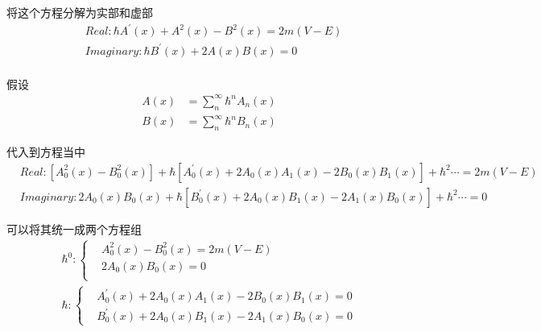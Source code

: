 \documentclass{article}
\begin{document}
将这个方程分解为实部和虚部
\begin{align*}
    &Real:\hbar A^\prime(x)+A^2(x)-B^2(x)=2m(V-E)\\
    &Imaginary:\hbar B^\prime(x)+2A(x)B(x)=0\\
\end{align*}

假设
\begin{align*}
    A(x)&=\sum_n^\infty \hbar^n A_n(x)\\
    B(x)&=\sum_n^\infty \hbar^n B_n(x)
\end{align*}

代入到方程当中
\begin{align*}
    &Real:\left[A^2_0(x)-B^2_0(x)\right]+\hbar\left[A^\prime_0(x)+2A_0(x)A_1(x)-2B_0(x)B_1(x)\right]+\hbar^2\cdots=2m(V-E)\\
    &Imaginary:2A_0(x)B_0(x)+\hbar\left[B^\prime_0(x)+2A_0(x)B_1(x)-2A_1(x)B_0(x)\right]+\hbar^2\cdots=0
\end{align*}

可以将其统一成两个方程组
\begin{align*}
    \hbar^0:
    \begin{cases}
        &A^2_0(x)-B^2_0(x)=2m(V-E)\\
        &2A_0(x)B_0(x)=0\\
    \end{cases}\\
    \hbar:
    \begin{cases}
        &A^\prime_0(x)+2A_0(x)A_1(x)-2B_0(x)B_1(x)=0\\
        &B^\prime_0(x)+2A_0(x)B_1(x)-2A_1(x)B_0(x)=0
    \end{cases}
\end{align*}
\end{document}
